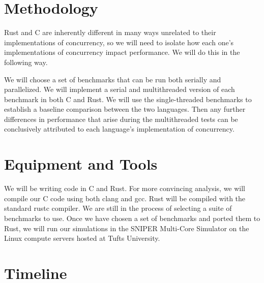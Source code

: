 \documentclass{article}
\begin{document}
\section*{Methodology}
Rust and C are inherently different in many ways unrelated to their implementations of concurrency, so we will need to isolate how each one's implementations of concurrency impact performance. We will do this in the following way.

We will choose a set of benchmarks that can be run both serially and parallelized. We will implement a serial and multithreaded version of each benchmark in both C and Rust. We will use the single-threaded benchmarks to
establish a baseline comparison between the two languages. Then any further differences in performance that arise during the multithreaded tests can be conclusively attributed to each language's implementation of concurrency.

\section*{Equipment and Tools}
We will be writing code in C and Rust. For more convincing analysis, we will compile our C code using both clang and gcc. Rust will be compiled with the standard rustc compiler. We are still in the process of selecting a suite of benchmarks to use. Once we have chosen a set of benchmarks and ported them to Rust, we will run our simulations in the SNIPER Multi-Core Simulator \cite{Sniper} on the Linux compute servers hosted at Tufts University.

\section*{Timeline}




\end{document}
